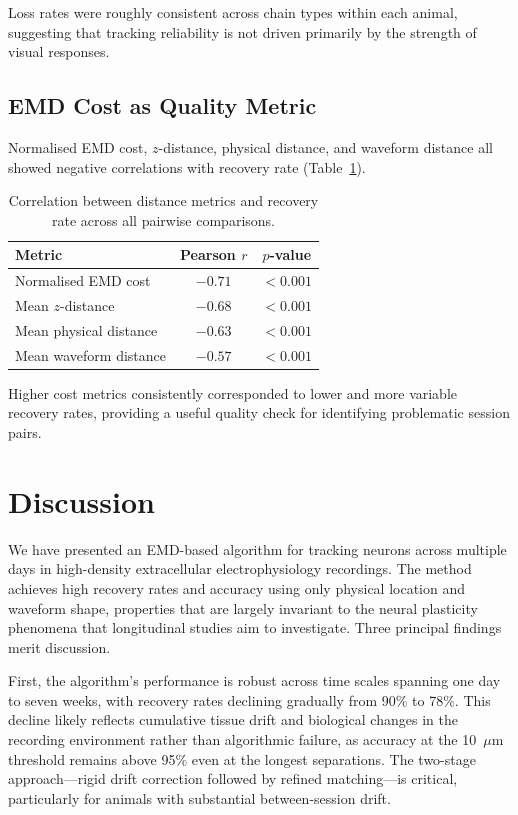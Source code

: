 \documentclass[11pt]{article}
\begin{document}
Loss rates were roughly consistent across chain types within each animal, suggesting that tracking reliability is not driven primarily by the strength of visual responses.

\subsection{EMD Cost as Quality Metric}

Normalised EMD cost, $z$-distance, physical distance, and waveform distance all showed negative correlations with recovery rate (Table~\ref{tab:cost}).

\begin{table}[H]
\centering
\caption{Correlation between distance metrics and recovery rate across all pairwise comparisons.}
\label{tab:cost}
\begin{tabular}{@{}lcc@{}}
\toprule
Metric & Pearson $r$ & $p$-value \\
\midrule
Normalised EMD cost & $-0.71$ & $< 0.001$ \\
Mean $z$-distance & $-0.68$ & $< 0.001$ \\
Mean physical distance & $-0.63$ & $< 0.001$ \\
Mean waveform distance & $-0.57$ & $< 0.001$ \\
\bottomrule
\end{tabular}
\end{table}

Higher cost metrics consistently corresponded to lower and more variable recovery rates, providing a useful quality check for identifying problematic session pairs.

\section{Discussion}

We have presented an EMD-based algorithm for tracking neurons across multiple days in high-density extracellular electrophysiology recordings. The method achieves high recovery rates and accuracy using only physical location and waveform shape, properties that are largely invariant to the neural plasticity phenomena that longitudinal studies aim to investigate. Three principal findings merit discussion.

First, the algorithm's performance is robust across time scales spanning one day to seven weeks, with recovery rates declining gradually from 90\% to 78\%. This decline likely reflects cumulative tissue drift and biological changes in the recording environment rather than algorithmic failure, as accuracy at the 10~$\mu$m threshold remains above 95\% even at the longest separations. The two-stage approach---rigid drift correction followed by refined matching---is critical, particularly for animals with substantial between-session drift.
\end{document}

